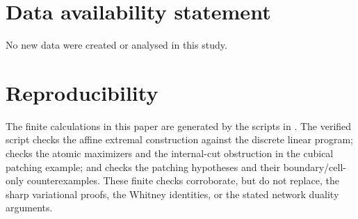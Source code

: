 \documentclass[11pt,letterpaper]{article}
\numberwithin{equation}{section}
\theoremstyle{plain}
\theoremstyle{definition}
\theoremstyle{remark}
\begin{document}





\appendix

\section*{Data availability statement}

No new data were created or analysed in this study.

\section*{Reproducibility}
The finite calculations in this paper are generated by the scripts in
.  The verified script 
checks the affine extremal construction against the discrete linear program;
 checks the atomic maximizers and
the internal-cut obstruction in the cubical patching example; and
 checks the patching hypotheses
and their boundary/cell-only counterexamples.  These finite checks corroborate,
but do not replace, the sharp variational proofs, the Whitney identities, or
the stated network duality arguments.



\end{document}
